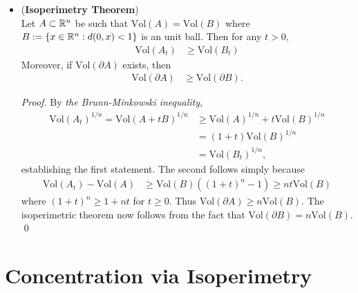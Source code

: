 \documentclass[11pt]{article}
\begin{document}
\begin{itemize}
\item \begin{theorem} (\textbf{Isoperimetry Theorem}) \citep{boucheron2013concentration, vershynin2018high, wainwright2019high}\\
Let $A \subset {\mathbb R}^n$ be such that $\text{Vol}(A) = \text{Vol}(B)$ where $B := \left\{x \in {\mathbb R}^n: d(0, x) < 1\right\}$ is an unit ball. Then for any $t > 0$, 
\begin{align}
\text{Vol}(A_t) &\ge  \text{Vol}(B_t) \label{ineqn: isoperimetry_inequality_blowup}
\end{align} Moreover, if $\text{Vol}(\partial A) $ exists, then
\begin{align}
\text{Vol}(\partial A)  &\ge \text{Vol}(\partial B).  \label{ineqn: isoperimetry_inequality_surface}
\end{align}
\end{theorem}
\begin{proof}
By \emph{the Brunn-Minkowski inequality}, 
\begin{align*}
\text{Vol}(A_t)^{1/n}  = \text{Vol}(A + tB)^{1/n} &\ge \text{Vol}(A)^{1/n} +  t\text{Vol}(B)^{1/n} \\
&= (1+t) \text{Vol}(B)^{1/n} \\
&= \text{Vol}(B_t)^{1/n},
\end{align*} establishing the first statement. The second follows simply because
\begin{align*}
\text{Vol}(A_t) - \text{Vol}(A) &\ge \text{Vol}(B)((1+t)^n -1) \ge nt\text{Vol}(B)
\end{align*} where $(1+t)^n \ge 1 + nt$ for $t \ge 0$. Thus $\text{Vol}(\partial A)  \ge n\text{Vol}(B)$. The isoperimetric theorem now follows from the fact that
$\text{Vol}(\partial B) = n\text{Vol}(B)$. \qed
\end{proof}
\end{itemize}

\section{Concentration via Isoperimetry}
\end{document}
